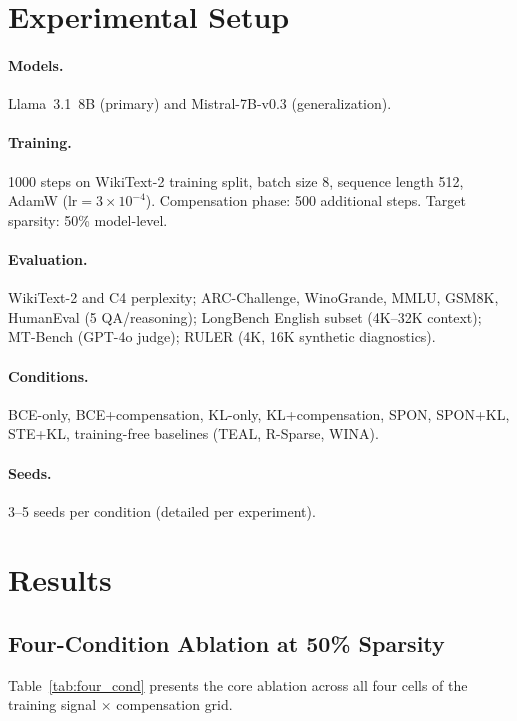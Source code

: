 \documentclass[11pt]{article}
\begin{document}
\section{Experimental Setup}

\paragraph{Models.} Llama~3.1~8B (primary) and Mistral-7B-v0.3 (generalization).

\paragraph{Training.} 1000 steps on WikiText-2 training split, batch size 8, sequence length 512, AdamW ($\text{lr} = 3\times10^{-4}$). Compensation phase: 500 additional steps. Target sparsity: 50\% model-level.

\paragraph{Evaluation.} WikiText-2 and C4 perplexity; ARC-Challenge, WinoGrande, MMLU, GSM8K, HumanEval (5 QA/reasoning); LongBench English subset (4K--32K context); MT-Bench (GPT-4o judge); RULER (4K, 16K synthetic diagnostics).

\paragraph{Conditions.} BCE-only, BCE+compensation, KL-only, KL+compensation, SPON, SPON+KL, STE+KL, training-free baselines (TEAL, R-Sparse, WINA).

\paragraph{Seeds.} 3--5 seeds per condition (detailed per experiment).


\section{Results}

\subsection{Four-Condition Ablation at 50\% Sparsity}

Table~\ref{tab:four_cond} presents the core ablation across all four cells of the training signal $\times$ compensation grid.
\end{document}
